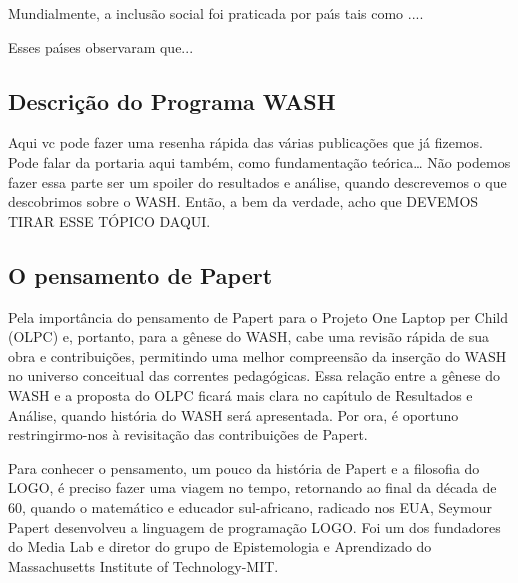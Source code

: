 \documentclass[
12pt,		%
openright,	%
twoside,  %
a4paper,			%
chapter=TITLE,		%
english,			%
french,				%
spanish,			%
brazil				%
]{USPSC-classe/USPSC_RedarTex}
\begin{document}
Mundialmente, a inclus\~ao social foi praticada por pa\'{\i}s tais como ....








Esses pa\'{\i}ses observaram que...








\subsection[Descri\c{c}\~ao do Programa WASH]{Descri\c{c}\~ao do Programa WASH}\label{Descri\c{c}\~ao do Programa WASH}
Aqui vc pode fazer uma resenha r\'apida das v\'arias publica\c{c}\~oes que j\'a fizemos. Pode falar da portaria aqui tamb\'em, como fundamenta\c{c}\~ao te\'orica… N\~ao podemos fazer essa parte ser um spoiler do resultados e an\'alise, quando descrevemos o que descobrimos sobre o WASH. Ent\~ao, a bem da verdade, acho que DEVEMOS TIRAR ESSE T\'OPICO DAQUI.








\subsection[O pensamento de Papert]{O pensamento de Papert}\label{O pensamento de Papert}
Pela import\^ancia do pensamento de Papert para o Projeto One Laptop per Child (OLPC) e, portanto, para a g\^enese do WASH, cabe uma revis\~ao r\'apida de sua obra e contribui\c{c}\~oes, permitindo uma melhor compreens\~ao da inser\c{c}\~ao do WASH no universo conceitual das correntes pedag\'ogicas. Essa rela\c{c}\~ao entre a g\^enese do WASH e a proposta do OLPC ficar\'a mais clara no cap\'{\i}tulo de Resultados e An\'alise, quando hist\'oria do WASH ser\'a apresentada. Por ora, \'e oportuno restringirmo-nos \`a revisita\c{c}\~ao das contribui\c{c}\~oes de Papert.








Para conhecer  o pensamento, um pouco da hist\'oria de Papert e  a filosofia do LOGO, \'e preciso fazer uma viagem no tempo, retornando ao final da d\'ecada de 60, quando o matem\'atico e educador sul-africano, radicado nos EUA, Seymour Papert desenvolveu a linguagem   de programa\c{c}\~ao LOGO.  Foi um dos fundadores do Media Lab e diretor do grupo de Epistemologia e Aprendizado do Massachusetts Institute of Technology-MIT.
\end{document}
